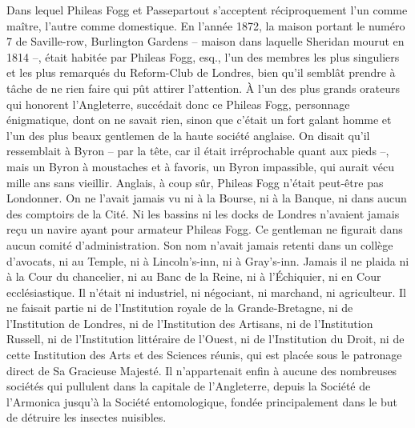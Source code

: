 \documentclass[12pt,a4paper,openany]{book}
\begin{document}
            
            Dans lequel Phileas Fogg et Passepartout s’acceptent réciproquement l’un comme maître, l’autre comme domestique.
                En l’année 1872, la maison portant le numéro 7 de Saville-row, Burlington Gardens – maison dans laquelle Sheridan mourut en 1814 –, était habitée par Phileas Fogg, esq., l’un des membres les plus singuliers et les plus remarqués du Reform-Club de Londres, bien qu’il semblât prendre à tâche de ne rien faire qui pût attirer l’attention.
                À l’un des plus grands orateurs qui honorent l’Angleterre, succédait donc ce Phileas Fogg, personnage énigmatique, dont on ne savait rien, sinon que c’était un fort galant homme et l’un des plus beaux gentlemen de la haute société anglaise.
                On disait qu’il ressemblait à Byron – par la tête, car il était irréprochable quant aux pieds –, mais un Byron à moustaches et à favoris, un Byron impassible, qui aurait vécu mille ans sans vieillir.
                Anglais, à coup sûr, Phileas Fogg n’était peut-être pas Londonner. On ne l’avait jamais vu ni à la Bourse, ni à la Banque, ni dans aucun des comptoirs de la Cité. Ni les bassins ni les docks de Londres n’avaient jamais reçu un navire ayant pour armateur Phileas Fogg. Ce gentleman ne figurait dans aucun comité d’administration. Son nom n’avait jamais retenti dans un collège d’avocats, ni au Temple, ni à Lincoln’s-inn, ni à Gray’s-inn. Jamais il ne plaida ni à la Cour du chancelier, ni au Banc de la Reine, ni à l’Échiquier, ni en Cour ecclésiastique. Il n’était ni industriel, ni négociant, ni marchand, ni agriculteur. Il ne faisait partie ni de l’Institution royale de la Grande-Bretagne, ni de l’Institution de Londres, ni de l’Institution des Artisans, ni de l’Institution Russell, ni de l’Institution littéraire de l’Ouest, ni de l’Institution du Droit, ni de cette Institution des Arts et des Sciences réunis, qui est placée sous le patronage direct de Sa Gracieuse Majesté. Il n’appartenait enfin à aucune des nombreuses sociétés qui pullulent dans la capitale de l’Angleterre, depuis la Société de l’Armonica jusqu’à la Société entomologique, fondée principalement dans le but de détruire les insectes nuisibles.
\end{document}
